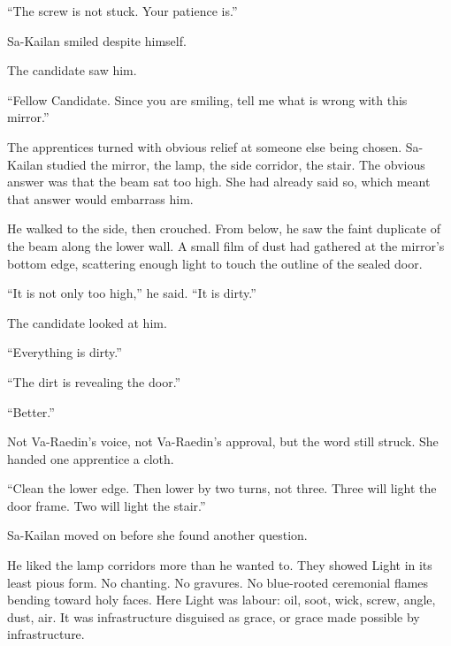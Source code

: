 “The screw is not stuck.
Your patience is.”\par

Sa-Kailan smiled despite himself.\par

The candidate saw him.\par

“Fellow Candidate.
Since you are smiling, tell me what is wrong with this mirror.”\par

The apprentices turned with obvious relief at someone else being chosen.
Sa-Kailan studied the mirror, the lamp, the side corridor, the stair.
The obvious answer was that the beam sat too high.
She had already said so, which meant that answer would embarrass him.\par

He walked to the side, then crouched.
From below, he saw the faint duplicate of the beam along the lower wall.
A small film of dust had gathered at the mirror’s bottom edge, scattering enough light to touch the outline of the sealed door.\par

“It is not only too high,” he said.
“It is dirty.”\par

The candidate looked at him.\par

“Everything is dirty.”\par

“The dirt is revealing the door.”\par

“Better.”\par

Not Va-Raedin’s voice, not Va-Raedin’s approval, but the word still struck.
She handed one apprentice a cloth.\par

“Clean the lower edge.
Then lower by two turns, not three.
Three will light the door frame.
Two will light the stair.”\par

Sa-Kailan moved on before she found another question.\par

He liked the lamp corridors more than he wanted to.
They showed Light in its least pious form.
No chanting.
No gravures.
No blue-rooted ceremonial flames bending toward holy faces.
Here Light was labour: oil, soot, wick, screw, angle, dust, air.
It was infrastructure disguised as grace, or grace made possible by infrastructure.\par

